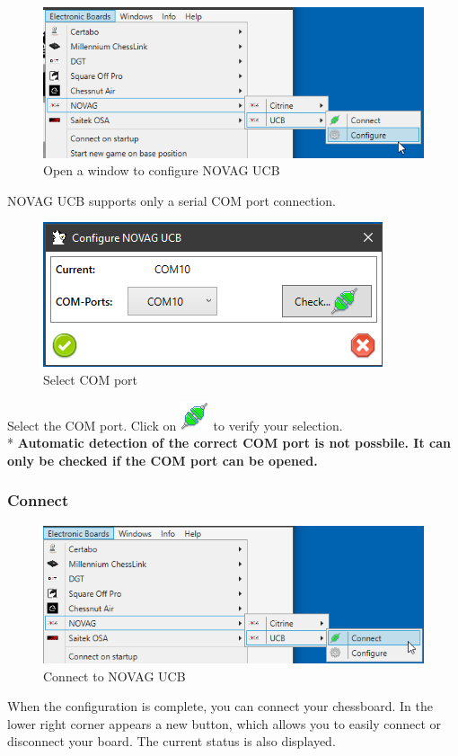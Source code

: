 \documentclass[11pt,a4paper]{article}
\begin{document}
\begin{figure}[H]
	\centering
	\includegraphics[scale=0.8]{NovagUCB1.png}
	\caption{Open a window to configure NOVAG UCB}
	\label{fig:NovagUCB1}
\end{figure}

NOVAG UCB supports only a serial COM port connection.

\begin{figure}[H]
	\centering
	\includegraphics[scale=1.0]{NovagUCB2.png}
	\caption{Select COM port}
	\label{fig:NovagUCB2}
\end{figure}

Select the COM port. Click on \includegraphics[scale=0.5]{connect.png} to verify your selection.\\
{\color{red}*} \textbf{Automatic detection of the correct COM port is not possbile. It can only be checked if the COM port can be opened.}

\subsubsection{Connect}
\begin{figure}[H]
	\centering
	\includegraphics[scale=0.8]{NovagUCB3.png}
	\caption{Connect to NOVAG UCB}
	\label{fig:NovagUCB3}
\end{figure}
When the configuration is complete, you can connect your chessboard.
In the lower right corner appears a new button, which allows you to easily connect or disconnect your board. The current status is also displayed.
\end{document}
